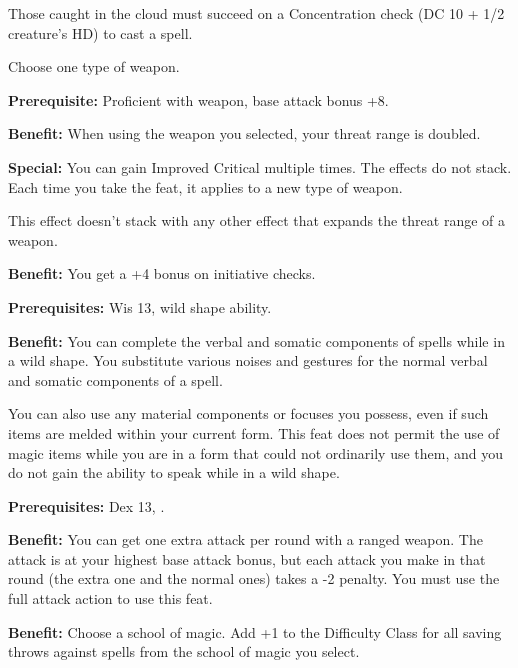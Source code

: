 Those caught in the cloud must succeed on a Concentration check (DC 10 + 1/2 creature's HD) to cast a spell.


Choose one type of weapon.

\textbf{Prerequisite:} Proficient with weapon, base attack bonus +8.

\textbf{Benefit:} When using the weapon you selected, your threat range is doubled.

\textbf{Special:} You can gain Improved Critical multiple times. The effects do not stack. Each time you take the feat, it applies to a new type of weapon.

This effect doesn't stack with any other effect that expands the threat range of a weapon.


\textbf{Benefit:} You get a +4 bonus on initiative checks.


\textbf{Prerequisites:} Wis 13, wild shape ability.

\textbf{Benefit:} You can complete the verbal and somatic components of spells while in a wild shape. You substitute various noises and gestures for the normal verbal and somatic components of a spell.

You can also use any material components or focuses you possess, even if such items are melded within your current form. This feat does not permit the use of magic items while you are in a form that could not ordinarily use them, and you do not gain the ability to speak while in a wild shape.


\textbf{Prerequisites:} Dex 13, .

\textbf{Benefit:} You can get one extra attack per round with a ranged weapon. The attack is at your highest base attack bonus, but each attack you make in that round (the extra one and the normal ones) takes a -2 penalty. You must use the full attack action to use this feat.


\textbf{Benefit:} Choose a school of magic. Add +1 to the Difficulty Class for all saving throws against spells from the school of magic you select.

